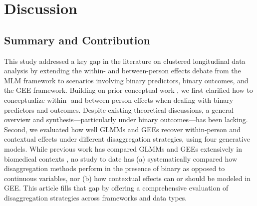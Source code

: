 


% 
% 

\section{Discussion}

\subsection{Summary and Contribution}  

This study addressed a key gap in the literature on clustered longitudinal data analysis by extending the within- and between-person effects debate from the MLM framework to scenarios involving binary predictors, binary outcomes, and the GEE framework. Building on prior conceptual work \parencite[e.g.,][]{raudenbush_hierarchical_2002, enders_centering_2007, bolger_intensive_2013, yaremych_centering_2023}, we first clarified how to conceptualize within- and between-person effects when dealing with binary predictors and outcomes. Despite existing theoretical discussions, a general overview and synthesis—particularly under binary outcomes---has been lacking. Second, we evaluated how well GLMMs and GEEs recover within-person and contextual effects under different disaggregation strategies, using four generative models. While previous work has compared GLMMs and GEEs extensively in biomedical contexts \parencite[e.g.,][]{diggle_analysis_2002, neuhaus_comparison_1991, zeger_models_1988}, no study to date has (a) systematically compared how disaggregation methods perform in the presence of binary as opposed to continuous variables, nor (b) how contextual effects can or should be modeled in GEE. This article fills that gap by offering a comprehensive evaluation of disaggregation strategies across frameworks and data types.

